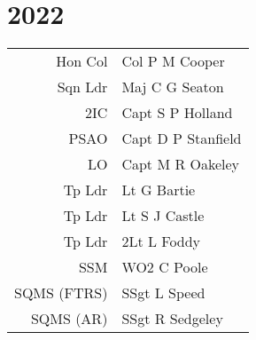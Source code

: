 \chapter*{2022}

\begin{center}
  \begin{tabular}{rl}
    Hon Col & Col P M Cooper \\
    Sqn Ldr & Maj C G Seaton \\
    2IC & Capt S P Holland \\
    PSAO & Capt D P Stanfield \\
    LO & Capt M R Oakeley \\
    Tp Ldr & Lt G Bartie \\
    Tp Ldr & Lt S J Castle \\
    Tp Ldr & 2Lt L Foddy \\
    SSM & WO2 C Poole \\
    SQMS (FTRS) & SSgt L Speed \\
    SQMS (AR) & SSgt R Sedgeley \\
  \end{tabular}
\end{center}

